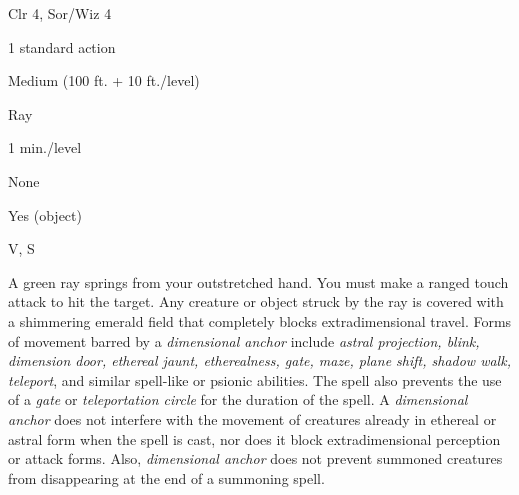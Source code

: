 
\begin{description*}
\item[Level:] Clr 4, Sor/Wiz 4
\item[Casting Time:] 1 standard action
\item[Range:] Medium (100 ft. + 10 ft./level)
\item[Effect:] Ray
\item[Duration:] 1 min./level
\item[Saving Throw:] None
\item[Spell Resistance:] Yes (object)
\item[Components:] V, S
\end{description*}

A green ray springs from your outstretched hand. You must make a ranged touch attack
to hit the target. Any creature or object struck by the ray is covered with a shimmering
emerald field that completely blocks extradimensional travel. Forms of movement
barred by a \textit{dimensional anchor} include \textit{astral projection, blink,
dimension door, ethereal jaunt, etherealness, gate, maze, plane shift, shadow walk,
teleport}, and similar spell-like or psionic abilities. The spell also prevents
the use of a \textit{gate} or \textit{teleportation circle} for the duration of
the spell.
A \textit{dimensional anchor} does not interfere with the movement of creatures
already in ethereal or astral form when the spell is cast, nor does it block extradimensional
perception or attack forms. Also, \textit{dimensional anchor} does not prevent
summoned creatures from disappearing at the end of a summoning spell.